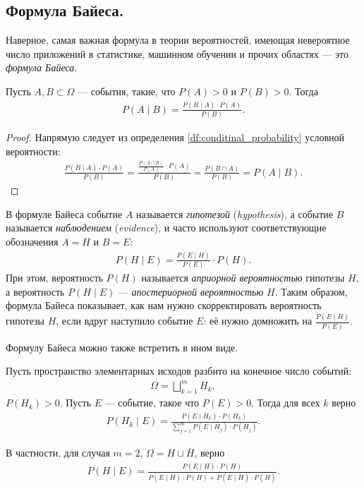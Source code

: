 \documentclass[../main.tex]{subfiles}
\begin{document}
\subsection{Формула Байеса.}

Наверное, самая важная формула в теории вероятностей, имеющая невероятное число приложений в статистике, машинном обучении и прочих областях --- это \textit{формула Байеса}.

\begin{prop}
 Пусть $ A, B \subset \Omega $ --- события, такие, что $P(A) > 0$ и  $P(B) > 0$. Тогда
 \begin{align}
  \label{equation:bayes_formula}
  P(A \mid B) = \frac{P(B \mid A) \cdot P(A)}{P(B)}.
 \end{align} 
\end{prop}
\begin{proof} Напрямую следует из определения \ref{df:conditinal_probability} условной вероятности:
 \begin{align*}
  \frac{P(B \mid A) \cdot P(A)}{P(B)} = \frac{\frac{P(A \cap B)}{P(A)} \cdot P(A)}{P(B)} = \frac{P(B \cap A)}{P(B)} = P(A \mid B).
 \end{align*}
\end{proof}

В формуле Байеса событие $ A $ называется \textit{гипотезой} (\textit{hypothesis}), а событие $ B $ называется \textit{наблюдением} (\textit{evidence}), и часто используют соответствующие обозначения $ A = H $ и  $ B = E $:
\begin{align*}
 P(H \mid E) = \frac{P(E \mid H)}{P(E)} \cdot P(H).
\end{align*} При этом, вероятность $ P(H) $ называется  \textit{априорной вероятностью} гипотезы $ H $, а вероятность $ P(H\mid E) $ ---  \textit{апостериорной вероятностью} $ H $. Таким образом, формула Байеса показывает, как нам нужно скорректировать вероятность гипотезы $ H $, если вдруг наступило событие $ E $: её нужно домножить на $ \frac{P(E\mid H)}{P(E)} $.

Формулу Байеса можно также встретить в ином виде.

\begin{thm}[Байеса]
 Пусть пространство элементарных исходов разбито на конечное число событий:
 \begin{align*}
  \Omega = \bigsqcup_{k=1}^{m} H_k,
 \end{align*} $ P(H_k) > 0 $. Пусть $ E $  --- событие, такое что $ P(E)>0 $. Тогда для всех $ k $ верно
 \begin{align*}
  P(H_k \mid E) = \frac{P(E \mid H_k) \cdot P(H_k)}{ \sum_{j=1}^{m} P(E \mid H_j) \cdot P(H_j)}.
 \end{align*}

 В частности, для случая $ m=2 $,  $ \Omega = H \sqcup \overline H $, верно
 \begin{align*}
  P(H \mid E) = \frac{P(E \mid H) \cdot P(H)}{P(E \mid H) \cdot P(H) + P(E \mid \overline H) \cdot P(\overline H)}.
 \end{align*}
\end{thm}
\end{document}
